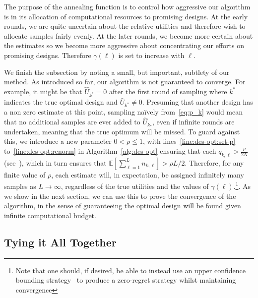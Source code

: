 The purpose of the annealing function is to control how aggressive our algorithm is in its allocation of
computational resources to promising designs.
At the early rounds, we are quite uncertain about the relative
utilities and therefore wish to allocate samples fairly evenly.  At the later rounds, we become more certain
about the estimates so we become more aggressive about concentrating our efforts on promising designs.
Therefore $\gamma(\ell)$ is set to increase with $\ell$.

We finish the subsection by noting a small, but important, subtlety of our method.  As introduced so far, our algorithm
is not guaranteed to converge.  For example, it might be that $\hat{U}_{k^*} =0$ after the first round
of sampling where $k^*$ indicates the true optimal design and $\bar{U}_{k^*} \ne0$.  
Presuming that another design has a non zero estimate at this point, sampling na\"{i}vely from~\eqref{eq:p_k} would 
mean that no additional samples are ever added to $\hat{U}_{k_*}$, even if infinite rounds are undertaken,
meaning that the true optimum will be missed.  To guard against this, we introduce a new parameter $0<\rho\le1$, 
with lines~\ref{line:des-opt:set-p} to~\ref{line:des-opt:renorm} in Algorithm~\ref{alg:des-opt}
ensuring that each $q_{k,\ell}>\frac{\rho}{2N}$ (see~\cite{vincent2017darc}), which in turn ensures that  
$\mathbb{E}\left[\sum_{\ell=1}^{L} n_{k,\ell}\right] >\rho L/2$.
Therefore, for any finite value of $\rho$, each
estimate will, in expectation, be assigned infinitely many samples as $L\rightarrow\infty$, regardless
of the true utilities and the values of $\gamma(\ell)$.\footnote{Note that one should, if desired, be able to instead 
	use an upper confidence bounding strategy~\cite{auer2002using} to produce a zero-regret 
	strategy whilst maintaining convergence}.
As we show in the next section, we can
use this to prove the convergence of the algorithm, in the sense of guaranteeing the optimal design
will be found given infinite computational budget.

\subsection{Tying it All Together}
\label{sec:tying-together}

